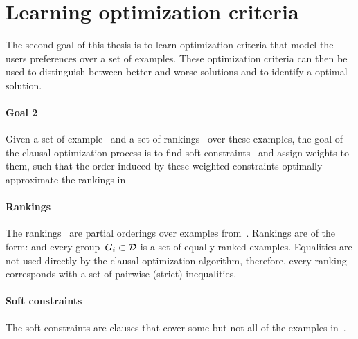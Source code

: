 
\section{Learning optimization criteria}
\label{sec:learning_user_preferences}
\label{sec:learning_optimization_criteria}

The second goal of this thesis is to learn optimization criteria that model the users preferences over a set of examples.
These optimization criteria can then be used to distinguish between better and worse solutions and to identify a optimal solution.

\begin{framed}
	\noindent
	\begin{minipage}{\textwidth}
		\paragraph{Goal 2}
		Given a set of example~ and a set of rankings~ over these examples, the goal of the clausal optimization process is to find soft constraints~ and assign weights to them, such that the order induced by these weighted constraints  optimally approximate the rankings in 
	\end{minipage}
\end{framed}

\paragraph{Rankings}
The rankings~ are partial orderings over examples from~.
Rankings are of the form:  and every group~$G_i \subset \mathcal{D}$ is a set of equally ranked examples. Equalities are not used directly by the clausal optimization algorithm, therefore, every ranking corresponds with a set of pairwise (strict) inequalities.

\paragraph{Soft constraints}
The soft constraints are clauses that cover some but not all of the examples in~.

